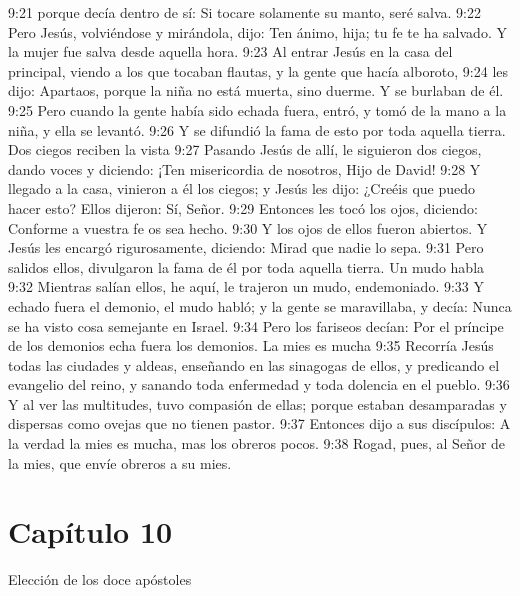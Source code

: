 9:21 porque decía dentro de sí: Si tocare solamente su manto, seré salva. 
9:22 Pero Jesús, volviéndose y mirándola, dijo: Ten ánimo, hija; tu fe te ha salvado. Y la mujer fue salva desde aquella hora. 
9:23 Al entrar Jesús en la casa del principal, viendo a los que tocaban flautas, y la gente que hacía alboroto, 
9:24 les dijo: Apartaos, porque la niña no está muerta, sino duerme. Y se burlaban de él. 
9:25 Pero cuando la gente había sido echada fuera, entró, y tomó de la mano a la niña, y ella se levantó. 
9:26 Y se difundió la fama de esto por toda aquella tierra. 
Dos ciegos reciben la vista 
9:27 Pasando Jesús de allí, le siguieron dos ciegos, dando voces y diciendo: ¡Ten misericordia de nosotros, Hijo de David! 
9:28 Y llegado a la casa, vinieron a él los ciegos; y Jesús les dijo: ¿Creéis que puedo hacer esto? Ellos dijeron: Sí, Señor. 
9:29 Entonces les tocó los ojos, diciendo: Conforme a vuestra fe os sea hecho. 
9:30 Y los ojos de ellos fueron abiertos. Y Jesús les encargó rigurosamente, diciendo: Mirad que nadie lo sepa. 
9:31 Pero salidos ellos, divulgaron la fama de él por toda aquella tierra. 
Un mudo habla 
9:32 Mientras salían ellos, he aquí, le trajeron un mudo, endemoniado. 
9:33 Y echado fuera el demonio, el mudo habló; y la gente se maravillaba, y decía: Nunca se ha visto cosa semejante en Israel. 
9:34 Pero los fariseos decían: Por el príncipe de los demonios echa fuera los demonios. 
La mies es mucha 
9:35 Recorría Jesús todas las ciudades y aldeas, enseñando en las sinagogas de ellos, y predicando el evangelio del reino, y sanando toda enfermedad y toda dolencia en el pueblo. 
9:36 Y al ver las multitudes, tuvo compasión de ellas; porque estaban desamparadas y dispersas como ovejas que no tienen pastor. 
9:37 Entonces dijo a sus discípulos: A la verdad la mies es mucha, mas los obreros pocos. 
9:38 Rogad, pues, al Señor de la mies, que envíe obreros a su mies. 
\section*{Capítulo 10}
Elección de los doce apóstoles  

